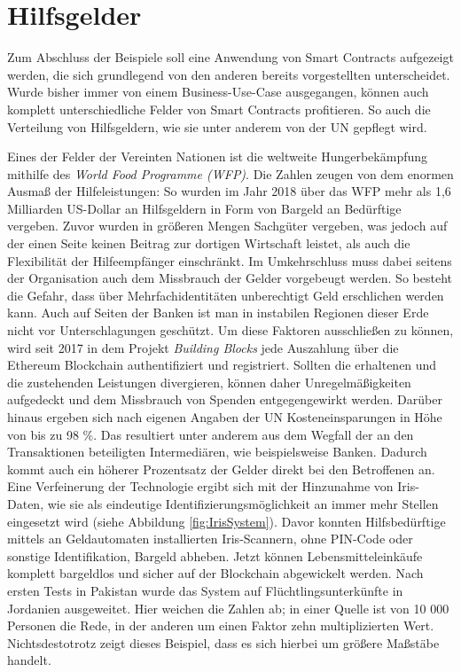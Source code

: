 \chapter{Hilfsgelder}
\label{chap:Hilfsgelder}
Zum Abschluss der Beispiele soll eine Anwendung von Smart Contracts aufgezeigt werden, die sich grundlegend von den anderen bereits vorgestellten unterscheidet. Wurde bisher immer von einem Business-Use-Case ausgegangen, können auch komplett unterschiedliche Felder von Smart Contracts profitieren. So auch die Verteilung von Hilfsgeldern, wie sie unter anderem von der UN gepflegt wird. 

Eines der Felder der Vereinten Nationen ist die weltweite Hungerbekämpfung mithilfe des \emph{World Food Programme (WFP)}. Die Zahlen zeugen von dem enormen Ausmaß der Hilfeleistungen: So wurden im Jahr 2018 über das WFP mehr als 1,6 Milliarden US-Dollar an Hilfsgeldern in Form von Bargeld an Bedürftige vergeben. Zuvor wurden in größeren Mengen Sachgüter vergeben, was jedoch auf der einen Seite keinen Beitrag zur dortigen Wirtschaft leistet, als auch die Flexibilität der Hilfeempfänger einschränkt. Im Umkehrschluss muss dabei seitens der Organisation auch dem Missbrauch der Gelder vorgebeugt werden. So besteht die Gefahr, dass über Mehrfachidentitäten unberechtigt Geld erschlichen werden kann. Auch auf Seiten der Banken ist man in instabilen Regionen dieser Erde nicht vor Unterschlagungen geschützt. Um diese Faktoren ausschließen zu können, wird seit 2017 in dem Projekt \emph{Building Blocks} jede Auszahlung über die Ethereum Blockchain authentifiziert und registriert. Sollten die erhaltenen und die zustehenden Leistungen divergieren, können daher Unregelmäßigkeiten aufgedeckt und dem Missbrauch von Spenden entgegengewirkt werden. Darüber hinaus ergeben sich nach eigenen Angaben der UN Kosteneinsparungen in Höhe von bis zu 98 \%. Das resultiert unter anderem aus dem Wegfall der an den Transaktionen beteiligten Intermediären, wie beispielsweise Banken. Dadurch kommt auch ein höherer Prozentsatz der Gelder direkt bei den Betroffenen an. Eine Verfeinerung der Technologie ergibt sich mit der Hinzunahme von Iris-Daten, wie sie als eindeutige Identifizierungsmöglichkeit an immer mehr Stellen eingesetzt wird (siehe Abbildung \ref{fig:IrisSystem}). Davor konnten Hilfsbedürftige mittels an Geldautomaten installierten Iris-Scannern, ohne PIN-Code oder sonstige Identifikation, Bargeld abheben. Jetzt können Lebensmitteleinkäufe komplett bargeldlos und sicher auf der Blockchain abgewickelt werden. Nach ersten Tests in Pakistan wurde das System auf Flüchtlingsunterkünfte in Jordanien ausgeweitet. Hier weichen die Zahlen ab; in einer Quelle ist von 10 000 Personen die Rede, in der anderen um einen Faktor zehn multiplizierten Wert. Nichtsdestotrotz zeigt dieses Beispiel, dass es sich hierbei um größere Maßstäbe handelt. \cite[vgl.][]{WFP2019, WFPBlockchain2018}

